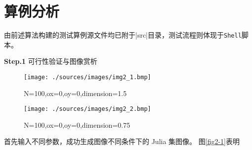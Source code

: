 \section{算例分析}

由前述算法构建的测试算例源文件均已附于\veb|src|目录，测试流程则体现于\verb|Shell|脚本。

\textbf{Step.1} 可行性验证与图像赏析

\begin{figure}[htb]
\centering
\begin{minipage}{0.48\linewidth}
\centering
\texttt{[image: ./sources/images/img2\_1.bmp]}
\caption{N=100,ox=0,oy=0,dimension=1.5}
\end{minipage}\hfill
\begin{minipage}{0.48\linewidth}
\centering
\texttt{[image: ./sources/images/img2\_2.bmp]}
\caption{N=100,ox=0,oy=0,dimension=0.75}
\end{minipage}
\end{figure}

首先输入不同参数，成功生成图像不同条件下的 Julia 集图像。
图\ref{fig2-1}表明

